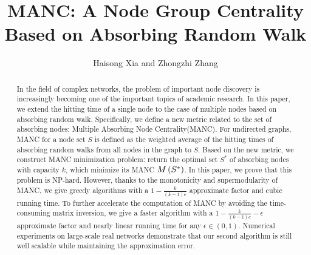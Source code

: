 \documentclass[sigconf]{acmart}
\begin{document}
\sloppy
\fancyhead{}
\title{MANC: A Node Group Centrality Based on Absorbing Random Walk}
\author{Haisong Xia and Zhongzhi Zhang \footnotemark}
\begin{abstract}
    In the field of complex networks, the problem of important node discovery is increasingly becoming one of the important topics of academic research.
    In this paper, we extend the hitting time of a single node to the case of multiple nodes based on absorbing random walk.
    Specifically, we define a new metric related to the set of absorbing nodes: Multiple Absorbing Node Centrality(MANC).
    For undirected graphs, MANC for a node set \(S\) is defined as the weighted average of the hitting times of absorbing random walks from all nodes in the graph to \(S\).
    Based on the new metric, we construct MANC minimization problem: return the optimal set \(S^*\) of absorbing nodes with capacity \(k\), which minimize its MANC \(M\left(S^*\right)\).
    In this paper, we prove that this problem is NP-hard. However, thanks to the monotonicity and supermodularity of MANC, we give greedy algorithms with a \(1-\frac{k}{(k-1)e}\) approximate factor and cubic running time.
    To further accelerate the computation of MANC by avoiding the time-consuming matrix inversion, we give a faster algorithm with a \(1-\frac{k}{(k-1)e}-\epsilon\) approximate factor and nearly linear running time for any \(\epsilon\in(0,1)\). Numerical experiments on large-scale real networks demonstrate that our second algorithm is still well scalable while maintaining the approximation error.
\end{abstract}
\maketitle
\renewcommand{\thefootnote}{*}
\end{document}
